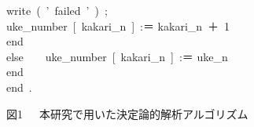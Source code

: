 \begin{center}
\begin{minipage}{120mm}
\hspace*{37mm}                                 write\ (\ '\ failed\ '\ )\ ;\\
\hspace*{37mm}                                 uke\_number\ [\ kakari\_n\ ]\  :＝ kakari\_n\ ＋\ 1\ \\
\hspace*{33mm}                               end\\
\hspace*{20mm}                    else\ \ \ \ uke\_number\ [\ kakari\_n\ ]\  :＝ uke\_n\\      
\hspace*{15mm}         end\\
                 end\ .
\bigskip

\begin{center}
  図1\ \ \  本研究で用いた決定論的解析アルゴリズム
\end{center}
\end{minipage}\end{center}
